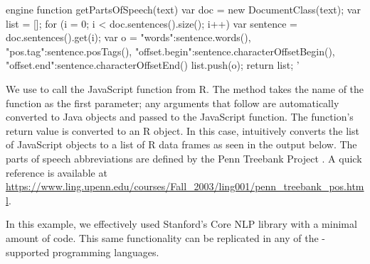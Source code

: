\begin{example}
engine %
  function getPartsOfSpeech(text) {
    var doc = new DocumentClass(text);
    var list = [];
    for (i = 0; i < doc.sentences().size(); i++) {
      var sentence = doc.sentences().get(i);
      var o = {
        "words":sentence.words(),
        "pos.tag":sentence.posTags(),
        "offset.begin":sentence.characterOffsetBegin(),
        "offset.end":sentence.characterOffsetEnd()
      }
      list.push(o);
    }
    return list;
  }
'
\end{example}
We use  to call the JavaScript function  from R. The method  takes the name of the function as the first parameter; any arguments that follow are automatically converted to Java objects and passed to the JavaScript function. The function's return value is converted to an R object. In this case,  intuitively converts the list of JavaScript objects to a list of R data frames as seen in the output below. The parts of speech abbreviations are defined by the Penn Treebank Project \citep{penntreebankproject}. A quick reference is available at \url{https://www.ling.upenn.edu/courses/Fall_2003/ling001/penn_treebank_pos.html}.


In this example, we effectively used Stanford's Core NLP library with a minimal amount of code. This same functionality can be replicated in any of the -supported programming languages.


